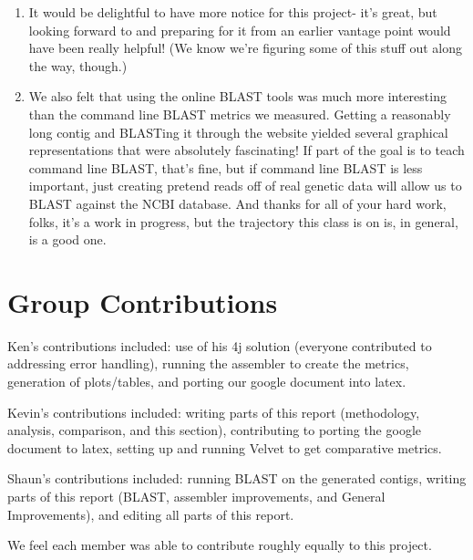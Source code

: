 \documentclass[12pt]{article}
\begin{document}
\begin{enumerate}
\item It would be delightful to have more notice for this project- it’s great, but looking forward to and preparing for it from an earlier vantage point would have been really helpful! (We know we’re figuring some of this stuff out along the way, though.)

\item We also felt that using the online BLAST tools was much more interesting than the command line BLAST metrics we measured.  Getting a reasonably long contig and BLASTing it through the website yielded several graphical representations that were absolutely fascinating!  If part of the goal is to teach command line BLAST, that’s fine, but if command line BLAST is less important, just creating pretend reads off of real genetic data will allow us to BLAST against the NCBI database. And thanks for all of your hard work, folks, it’s a work in progress, but the trajectory this class is on is, in general, is a good one.

\end{enumerate}

\section{Group Contributions}
Ken's contributions included: use of his 4j solution (everyone contributed to addressing error handling), running the assembler to create the metrics, generation of plots/tables, and porting our google document into latex.

Kevin's contributions included: writing parts of this report (methodology, analysis, comparison, and this section), contributing to porting the google document to latex, setting up and running Velvet to get comparative metrics.

Shaun's contributions included: running BLAST on the generated contigs, writing parts of this report (BLAST, assembler improvements, and General Improvements), and editing all parts of this report.

We feel each member was able to contribute roughly equally to this project.
\end{document}
